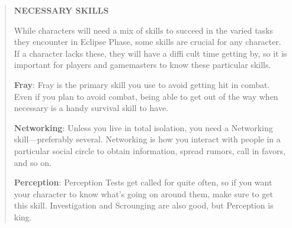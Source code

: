 \begin{quotation}
\textbf{NECESSARY SKILLS}

While characters will need a mix of skills to
succeed in the varied tasks they encounter in
Eclipse Phase, some skills are crucial for any
character. If a character lacks these, they will
have a diffi cult time getting by, so it is important
for players and gamemasters to know
these particular skills.

\textbf{Fray}: Fray is the primary skill you use to avoid
getting hit in combat. Even if you plan to avoid
combat, being able to get out of the way when
necessary is a handy survival skill to have.

\textbf{Networking}: Unless you live in total isolation,
you need a Networking skill—preferably several.
Networking is how you interact with people in
a particular social circle to obtain information,
spread rumors, call in favors, and so on.

\textbf{Perception}: Perception Tests get called for
quite often, so if you want your character to
know what’s going on around them, make sure
to get this skill. Investigation and Scrounging
are also good, but Perception is king.
\end{quotation}


